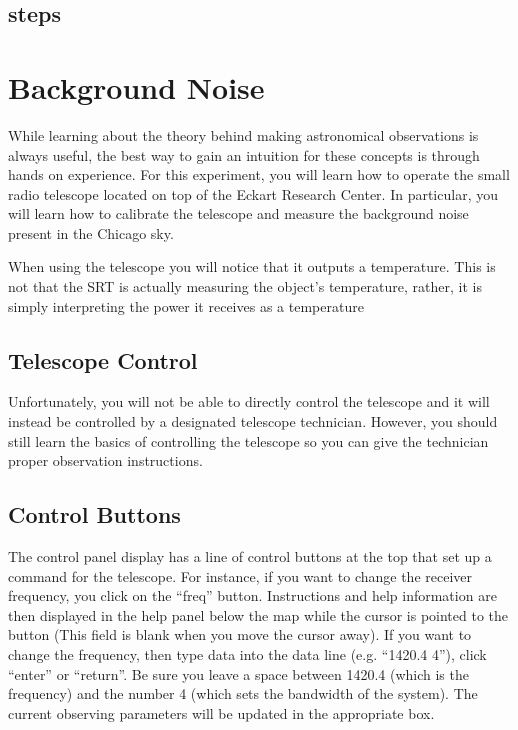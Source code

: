 \subsection{steps}
\begin{steps}
	\item
	
\end{steps}



\section{Background Noise} %
While learning about the theory behind making astronomical observations is always useful, the best way to gain an intuition for these concepts is through hands on experience. For this experiment, you will learn how to operate the small radio telescope located on top of the Eckart Research Center. In particular, you will learn how to calibrate the telescope and measure the background noise present in the Chicago sky.

When using the telescope you will notice that it outputs a temperature. This is not that the SRT is actually measuring the object's temperature, rather, it is simply interpreting the power it receives as a temperature

\subsection{Telescope Control}
Unfortunately, you will not be able to directly control the telescope and it will instead be controlled by a designated telescope technician. However, you should still learn the basics of controlling the telescope so you can give the technician proper observation instructions. 

\subsection{Control Buttons}
The control panel display has a line of control buttons at the top that set
up a command for the telescope. For instance, if you want to change the receiver
frequency, you click on the “freq” button. Instructions and help information are
then displayed in the help panel below the map while the cursor is pointed to the
button (This field is blank when you move the cursor away). If you want to
change the frequency, then type data into the data line (e.g. “1420.4 4”), click
“enter” or “return”. Be sure you leave a space between 1420.4 (which is the
frequency) and the number 4 (which sets the bandwidth of the system). The
current observing parameters will be updated in the appropriate box.

